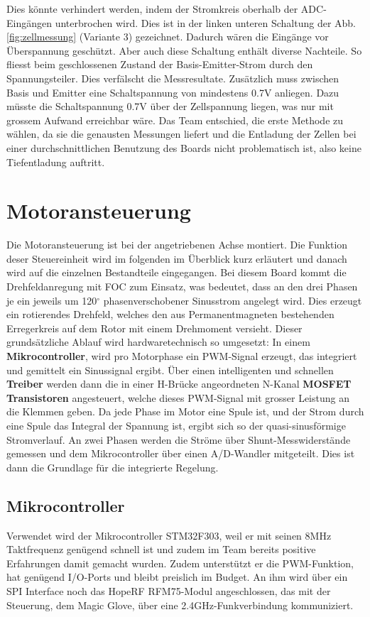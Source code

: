 Dies könnte verhindert werden, indem der Stromkreis oberhalb der ADC-Eingängen unterbrochen wird. Dies ist in der linken unteren Schaltung der Abb.\ref{fig:zellmessung} (Variante 3) gezeichnet. Dadurch wären die Eingänge vor Überspannung geschützt. Aber auch diese Schaltung enthält diverse Nachteile. So fliesst beim geschlossenen Zustand der Basis-Emitter-Strom durch den Spannungsteiler. Dies verfälscht die Messresultate. Zusätzlich muss zwischen Basis und Emitter eine Schaltspannung von mindestens 0.7V anliegen. Dazu müsste die Schaltspannung 0.7V über der Zellspannung liegen, was nur mit grossem Aufwand erreichbar wäre. 
Das Team entschied, die erste Methode zu wählen, da sie die genausten Messungen liefert und die Entladung der Zellen bei einer durchschnittlichen Benutzung des Boards nicht problematisch ist, also keine Tiefentladung auftritt.

\section{Motoransteuerung}
\label{HW_Motoransteuerung}
Die Motoransteuerung ist bei der angetriebenen Achse montiert. Die Funktion deser Steuereinheit wird im folgenden im Überblick kurz erläutert und danach wird auf die einzelnen Bestandteile eingegangen.
Bei diesem Board kommt die Drehfeldanregung mit FOC zum Einsatz, was bedeutet, dass an den drei Phasen je ein jeweils um 120\(^\circ\) phasenverschobener Sinusstrom angelegt wird. Dies erzeugt ein rotierendes Drehfeld, welches den aus Permanentmagneten bestehenden Erregerkreis auf dem Rotor mit einem Drehmoment versieht. Dieser grundsätzliche Ablauf wird hardwaretechnisch so umgesetzt:
In einem \textbf{Mikrocontroller}, wird pro Motorphase ein PWM-Signal erzeugt, das integriert und gemittelt ein Sinussignal ergibt. Über einen intelligenten und schnellen \textbf{Treiber} werden dann die in einer H-Brücke angeordneten N-Kanal \textbf{MOSFET Transistoren} angesteuert, welche dieses PWM-Signal mit grosser Leistung an die Klemmen geben. Da jede Phase im Motor eine Spule ist, und der Strom durch eine Spule das Integral der Spannung ist, ergibt sich so der quasi-sinusförmige Stromverlauf.
An zwei Phasen werden die Ströme über Shunt-Messwiderstände gemessen und dem Mikrocontroller über einen A/D-Wandler mitgeteilt. Dies ist dann die Grundlage für die integrierte Regelung.

\subsection*{Mikrocontroller}
Verwendet wird der Mikrocontroller STM32F303, weil er mit seinen 8MHz Taktfrequenz genügend schnell ist und zudem im Team bereits positive Erfahrungen damit gemacht wurden. Zudem unterstützt er die PWM-Funktion, hat genügend I/O-Ports und bleibt preislich im Budget. 
An ihm wird über ein SPI Interface noch das HopeRF RFM75-Modul angeschlossen, das mit der Steuerung, dem Magic Glove, über eine 2.4GHz-Funkverbindung kommuniziert.


